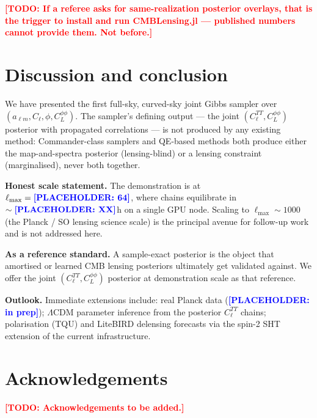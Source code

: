 \documentclass[twocolumn,superscriptaddress,aps,prl,floatfix]{revtex4-2}
\newcommand{\alm}{a_{\ell m}}
\newcommand{\cl}{C_\ell}
\newcommand{\clpp}{C_L^{\phi\phi}}
\newcommand{\lmax}{\ell_{\max}}
\newcommand{\todo}[1]{\textcolor{red}{\textbf{[TODO: #1]}}}
\newcommand{\placeholder}[1]{\textcolor{blue}{\textbf{[PLACEHOLDER: #1]}}}
\begin{document}
\todo{If a referee asks for same-realization posterior overlays, that is the
trigger to install and run CMBLensing.jl --- published numbers cannot provide
them. Not before.}

\section{Discussion and conclusion}
\label{sec:discussion}

We have presented the first full-sky, curved-sky joint Gibbs sampler over
$(\alm, \cl, \phi, \clpp)$.
The sampler's defining output — the joint $(\cl^{TT}, \clpp)$ posterior with
propagated correlations — is not produced by any existing method:
Commander-class samplers \citep{Commander,Almanac,Flinch} and QE-based methods
\citep{Carron:2017} both produce either the map-and-spectra posterior
(lensing-blind) or a lensing constraint (marginalised), never both together.

\textbf{Honest scale statement.}
The demonstration is at $\lmax = \placeholder{64}$, where chains
equilibrate in $\sim \placeholder{XX}$h on a single GPU node.
Scaling to $\lmax \sim 1000$ (the Planck / SO lensing science scale) is the
principal avenue for follow-up work and is not addressed here.

\textbf{As a reference standard.}
A sample-exact posterior is the object that amortised or learned CMB lensing
posteriors \citep{Doeser:2024} ultimately get validated against.
We offer the joint $(\cl^{TT}, \clpp)$ posterior at demonstration scale as
that reference.

\textbf{Outlook.}
Immediate extensions include:
real Planck data (\placeholder{in prep});
$\Lambda$CDM parameter inference from the posterior $\cl^{TT}$ chains;
polarisation (TQU) and LiteBIRD delensing forecasts via the spin-2 SHT
extension of the current infrastructure.

\section*{Acknowledgements}
\todo{Acknowledgements to be added.}
\end{document}
